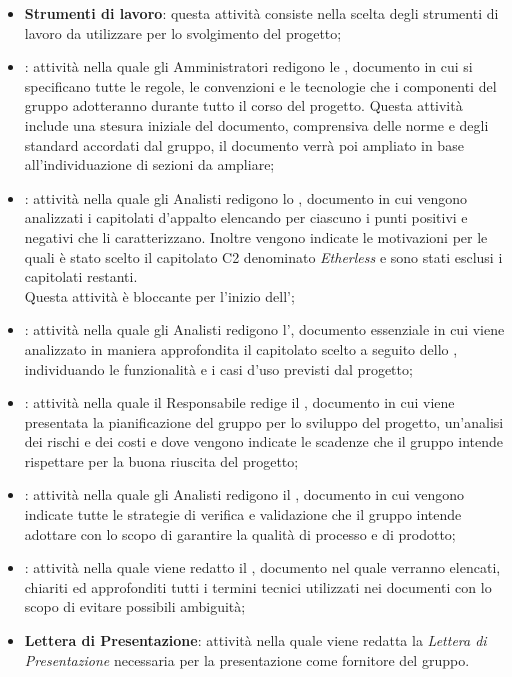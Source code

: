 \begin{itemize}
	\item \textbf{Strumenti di lavoro}: questa attività consiste nella scelta degli strumenti di lavoro da utilizzare per lo svolgimento del progetto;
	\item \textbf{\NdP{}}: attività nella quale gli Amministratori redigono le \textit{\NdP{}}, documento in cui si specificano tutte le regole, le convenzioni e le tecnologie che i componenti del gruppo adotteranno durante tutto il corso del progetto. Questa attività include una stesura iniziale del documento, comprensiva delle norme e degli standard accordati dal gruppo, il documento verrà poi ampliato in base all'individuazione di sezioni da ampliare;
	\item \textbf{\SdF{}}: attività nella quale gli Analisti redigono lo \textit{\SdF}, documento in cui vengono analizzati i capitolati d'appalto elencando per ciascuno i punti positivi e negativi che li caratterizzano. Inoltre vengono indicate le motivazioni per le quali è stato scelto il capitolato C2 denominato \textit{Etherless} e sono stati esclusi i capitolati restanti. \\
	Questa attività è bloccante per l'inizio dell'\textit{\AdR{}};
	\item \textbf{\AdR{}}: attività nella quale gli Analisti redigono l'\textit{\AdR{}}, documento essenziale in cui viene analizzato in maniera approfondita il capitolato scelto a seguito dello \textit{\SdF}, individuando le funzionalità e i casi d'uso previsti dal progetto;
	\item \textbf{\PdP{}}: attività nella quale il Responsabile redige il \textit{\PdP}, documento in cui viene presentata la pianificazione del gruppo per lo sviluppo del progetto, un'analisi dei rischi e dei costi e dove vengono indicate le scadenze che il gruppo intende rispettare per la buona riuscita del progetto;
	\item \textbf{\PdQ{}}: attività nella quale gli Analisti redigono il \textit{\PdQ}, documento in cui vengono indicate tutte le strategie di verifica e validazione che il gruppo intende adottare con lo scopo di garantire la qualità di processo e di prodotto;
	\item \textbf{\Glossario{}}: attività nella quale viene redatto il \textit{\Glossario}, documento nel quale verranno elencati, chiariti ed approfonditi tutti i termini tecnici utilizzati nei documenti con lo scopo di evitare possibili ambiguità;
	\item \textbf{Lettera di Presentazione}: attività nella quale viene redatta la \textit{Lettera di Presentazione} necessaria per la presentazione come fornitore del gruppo.
\end{itemize}
